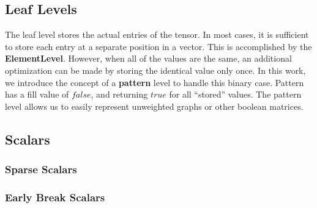

\subsection{Leaf Levels}

The leaf level stores the actual entries of the tensor. In most cases, it is
sufficient to store each entry at a separate position in a vector. This is accomplished by the \textbf{ElementLevel}. However, when all of the
values are the same, an additional optimization can be made by storing the
identical value only once. In this work, we introduce the concept of a \textbf{pattern}
level to handle this binary case. Pattern has a fill value of $false$, and returning $true$ for all ``stored'' values. The pattern level allows us to easily represent unweighted graphs or other boolean matrices.

\subsection{Scalars}

\subsubsection{Sparse Scalars}
\subsubsection{Early Break Scalars}

